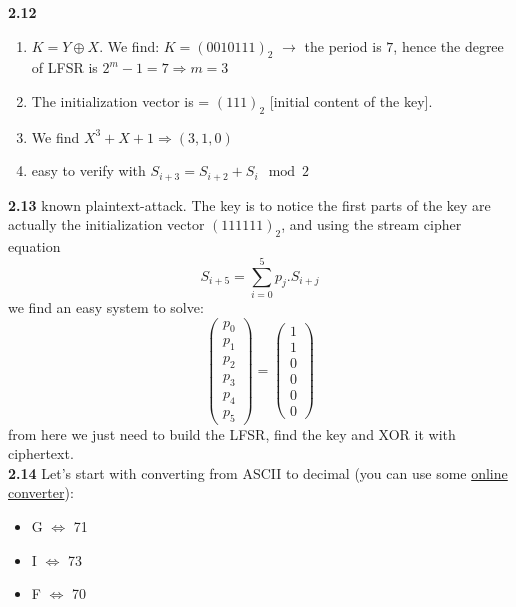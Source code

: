 \textbf{2.12}
\begin{enumerate}
    \item $K = Y \oplus X$. We find: $K = (0010111)_2$ $\rightarrow $ the period is $7$, hence the degree of LFSR is $2^m - 1 = 7 \Rightarrow m = 3$
    \item The initialization vector is = $(111)_2$ [initial content of the key].
    \item We find $X^3 + X + 1 \Rightarrow (3,1,0)$
    \item easy to verify with $S_{i+3} = S_{i+2} + S_i \mod{2} $
\end{enumerate}

\textbf{2.13}
known plaintext-attack. The key is to notice the first parts of the key are actually the initialization vector $(111111)_2$, and using the stream cipher equation \begin{equation*}
    S_{i+5} = \sum_{i=0}^{5} p_j.S_{i+j}
\end{equation*}
we find an easy system to solve: 
\begin{equation*}
    \begin{pmatrix}
        p_0\\
        p_1\\
        p_2\\
        p_3\\
        p_4\\
        p_5
    \end{pmatrix} = \begin{pmatrix}
        1\\
        1\\
        0\\
        0\\
        0\\
        0
    \end{pmatrix}
\end{equation*}
from here we just need to build the LFSR, find the key and XOR it with ciphertext. \\

\textbf{2.14}
Let's start with converting from ASCII to decimal (you can use some \href{https://www.rapidtables.com/convert/number/ascii-hex-bin-dec-converter.html}{online converter}):
\begin{itemize}
    \item G $\Leftrightarrow$ 71 
    \item I $\Leftrightarrow$ 73
    \item F $\Leftrightarrow$ 70
\end{itemize}


